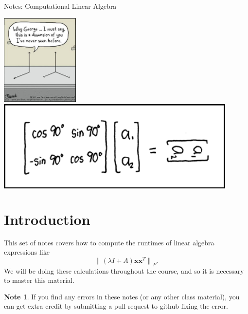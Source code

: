 \documentclass[10pt]{article}
\theoremstyle{definition}
\newtheorem{note}{Note}
\newcommand{\trans}[1]{{#1}^{T}}
\newcommand{\x}{\mathbf x}
\newcommand{\lF}[1]{{\lVert {#1} \rVert}_F}
\begin{document}
\begin{center}
{
\Huge
Notes: Computational Linear Algebra
}

\vspace{0.15in}
\end{center}

\begin{center}
\includegraphics[height=1.8in]{comic}
\includegraphics[height=1.8in]{matrix_transform}
\end{center}


\section{Introduction}

This set of notes covers how to compute the runtimes of linear algebra expressions like
\begin{equation}
\lF{(\lambda I + A) \x \trans \x}
.
\end{equation}
We will be doing these calculations throughout the course,
and so it is necessary to master this material.

\begin{note}
If you find any errors in these notes (or any other class material),
you can get extra credit by submitting a pull request to github fixing the error.
\end{note}

\end{document}

